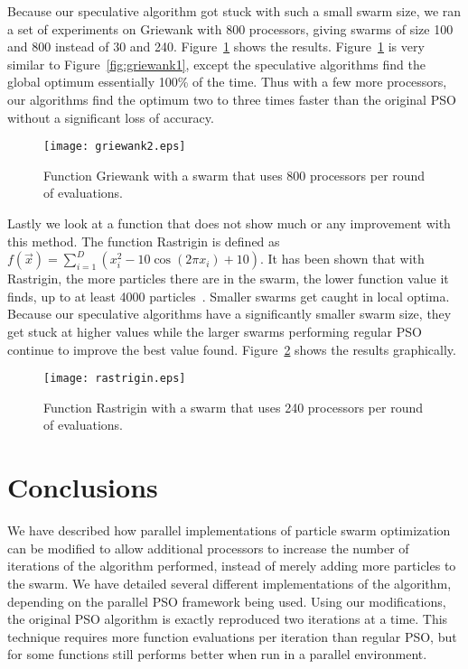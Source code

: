 \documentclass[letterpaper]{sig-alt-release2}
\newcommand{\fig}[1]{Figure~\ref{fig:#1}}
\begin{document}
Because our speculative algorithm got stuck with such a small swarm size, we
ran a set of experiments on Griewank with 800 processors, giving swarms of size
100 and 800 instead of 30 and 240.  \fig{griewank2} shows the results.
\fig{griewank2} is very similar to \fig{griewank1}, except the speculative
algorithms find the global optimum essentially 100\% of the time.  Thus with a
few more processors, our algorithms find the optimum two to three times faster
than the original PSO without a significant loss of accuracy.

\begin{figure}
  \centering
  \texttt{[image: griewank2.eps]}
  \caption{Function Griewank with a swarm that uses 800 processors per round of
  evaluations.}
  \label{fig:griewank2}
\end{figure}

Lastly we look at a function that does not show much or any improvement with
this method.  The function Rastrigin is defined as $f(\Vec{x}) = \sum_{i=1}^D
\left(x_i^2 - 10\cos\left(2\pi x_i\right) + 10\right)$.  It has been shown that
with Rastrigin, the more particles there are in the swarm, the lower function
value it finds, up to at least 4000 particles~\cite{mcnabb-cec09}.  Smaller
swarms get caught in local optima.  Because our speculative algorithms have a
significantly smaller swarm size, they get stuck at higher values while the
larger swarms performing regular PSO continue to improve the best value found.
\fig{rastrigin} shows the results graphically.

\begin{figure}
  \centering
  \texttt{[image: rastrigin.eps]}
  \caption{Function Rastrigin with a swarm that uses 240 processors per round
  of evaluations.}
  \label{fig:rastrigin}
\end{figure}

\section{Conclusions}
\label{sec:conclusion}

We have described how parallel implementations of particle swarm optimization
can be modified to allow additional processors to increase the number of
iterations of the algorithm performed, instead of merely adding more particles
to the swarm.  We have detailed several different implementations of the
algorithm, depending on the parallel PSO framework being used.  Using our
modifications, the original PSO algorithm is exactly reproduced two iterations
at a time.  This technique requires more function evaluations per iteration
than regular PSO, but for some functions still performs better when run in a
parallel environment.
\end{document}

